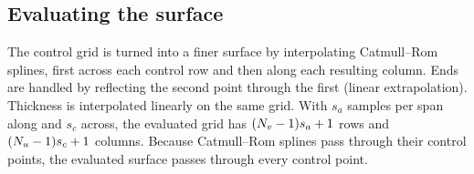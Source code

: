 \subsection{Evaluating the surface}
The control grid is turned into a finer surface by interpolating Catmull--Rom
splines, first across each control row and then along each resulting column.
Ends are handled by reflecting the second point through the first (linear
extrapolation). Thickness is interpolated linearly on the same grid. With
$s_a$ samples per span along and $s_c$ across, the evaluated grid has
$(N_v - 1)s_a + 1$ rows and $(N_u - 1)s_c + 1$ columns. Because Catmull--Rom
splines pass through their control points, the evaluated surface passes
through every control point.

